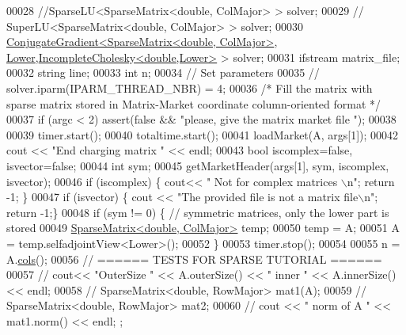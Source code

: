 \begin{DoxyCode}
00028   \textcolor{comment}{//SparseLU<SparseMatrix<double, ColMajor> >   solver;}
00029 \textcolor{comment}{//   SuperLU<SparseMatrix<double, ColMajor> >   solver;}
00030   \hyperlink{group___iterative_linear_solvers___module_class_eigen_1_1_conjugate_gradient}{ConjugateGradient<SparseMatrix<double, ColMajor>}, 
      \hyperlink{group__enums_gga39e3366ff5554d731e7dc8bb642f83cda891792b8ed394f7607ab16dd716f60e6}{Lower},\hyperlink{class_eigen_1_1_incomplete_cholesky}{IncompleteCholesky<double,Lower>} > solver; 
00031   ifstream matrix\_file; 
00032   \textcolor{keywordtype}{string} line;
00033   \textcolor{keywordtype}{int}  n;
00034   \textcolor{comment}{// Set parameters}
00035 \textcolor{comment}{//   solver.iparm(IPARM\_THREAD\_NBR) = 4;}
00036   \textcolor{comment}{/* Fill the matrix with sparse matrix stored in Matrix-Market coordinate column-oriented format */}
00037   \textcolor{keywordflow}{if} (argc < 2) assert(\textcolor{keyword}{false} && \textcolor{stringliteral}{"please, give the matrix market file "});
00038   
00039   timer.start();
00040   totaltime.start();
00041   loadMarket(A, args[1]);
00042   cout << \textcolor{stringliteral}{"End charging matrix "} << endl;
00043   \textcolor{keywordtype}{bool} iscomplex=\textcolor{keyword}{false}, isvector=\textcolor{keyword}{false};
00044   \textcolor{keywordtype}{int} sym;
00045   getMarketHeader(args[1], sym, iscomplex, isvector);
00046   \textcolor{keywordflow}{if} (iscomplex) \{ cout<< \textcolor{stringliteral}{" Not for complex matrices \(\backslash\)n"}; \textcolor{keywordflow}{return} -1; \}
00047   \textcolor{keywordflow}{if} (isvector) \{ cout << \textcolor{stringliteral}{"The provided file is not a matrix file\(\backslash\)n"}; \textcolor{keywordflow}{return} -1;\}
00048   \textcolor{keywordflow}{if} (sym != 0) \{ \textcolor{comment}{// symmetric matrices, only the lower part is stored}
00049     \hyperlink{group___sparse_core___module_class_eigen_1_1_sparse_matrix}{SparseMatrix<double, ColMajor>} temp; 
00050     temp = A;
00051     A = temp.selfadjointView<Lower>();
00052   \}
00053   timer.stop();
00054   
00055   n = A.\hyperlink{group___sparse_core___module_aa391750e3c530227e4a5c3c52e959975}{cols}();
00056   \textcolor{comment}{// ====== TESTS FOR SPARSE TUTORIAL ======}
00057 \textcolor{comment}{//   cout<< "OuterSize " << A.outerSize() << " inner " << A.innerSize() << endl; }
00058 \textcolor{comment}{//   SparseMatrix<double, RowMajor> mat1(A); }
00059 \textcolor{comment}{//   SparseMatrix<double, RowMajor> mat2;}
00060 \textcolor{comment}{//   cout << " norm of A " << mat1.norm() << endl; ;}

\end{DoxyCode}
